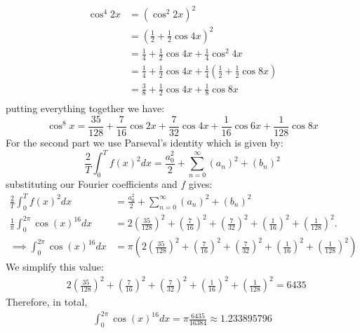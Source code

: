 \documentclass[11pt]{article}
\begin{document}
\begin{solution}
\begin{align*}
\end{align*}
\begin{align*}
    \cos^4 2x &= (\cos^2 2x)^2\\
    &=(\frac 1 2 + \frac 1 2 \cos 4x)^2\\
    &= \frac 1 4 + \frac 1 2 \cos 4x + \frac 1 4 \cos^2 4x\\
    &= \frac 1 4 + \frac 1 2 \cos 4x + \frac 1 4 (\frac 1 2 + \frac 1 2 \cos 8x)\\
    &= \frac 3 8 + \frac 1 2 \cos 4x + \frac 1 8 \cos 8x\\
\end{align*}
putting everything together we have:
\[
    \cos^8x  = \frac{35}{128} + \frac{7}{16}\cos 2x + \frac{7}{32}\cos 4x + \frac{1}{16} \cos 6x + \frac{1}{128}\cos 8x
\]
For the second part we use Parseval's identity which is given by: 
\[
    \frac{2}{T} \int_0^T f(x)^2 d x= \frac{a_0^2}{2}+\sum_{n=0}^{\infty}\left(a_n\right)^2+\left(b_n\right)^2
\]
substituting our Fourier coefficients and $f$ gives: 
\begin{align*}
    \frac{2}{T} \int_0^T f(x)^2 d x&= \frac{a_0^2}{2}+\sum_{n=0}^{\infty}\left(a_n\right)^2+\left(b_n\right)^2\\
    \frac{1}{\pi} \int_0^{2\pi} \cos(x)^{16} d x&= 2\left(\frac{35}{128}\right)^2 + \left(\frac{7}{16}\right)^2 + \left(\frac{7}{32}\right)^2 + \left(\frac{1}{16}\right)^2 + \left(\frac{1}{128}\right)^2.\\
    \implies 
    \int_0^{2\pi} \cos(x)^{16} d x
    &= 
    \pi\left(2\left(\frac{35}{128}\right)^2 + \left(\frac{7}{16}\right)^2 + \left(\frac{7}{32}\right)^2 + \left(\frac{1}{16}\right)^2 + \left(\frac{1}{128}\right)^2\right)
\end{align*}
We simplify this value:
\begin{align*}
    &
    2 \left(\frac{35}{128}\right)^2 
    + 
    \left(\frac{7}{16}\right)^2 
    + 
    \left(\frac{7}{32}\right)^2 
    + 
    \left(\frac{1}{16}\right)^2 
    + 
    \left(\frac{1}{128}\right)^2
    =
    6435
\end{align*}
Therefore, in total,
\begin{align*}
    \int_0^{2\pi} \cos(x)^{16} d x
    =
    \pi 
    \frac{ 6435 }{ 16384 }
    \approx 
    1.233895796
\end{align*}
\end{solution}
\end{document}
